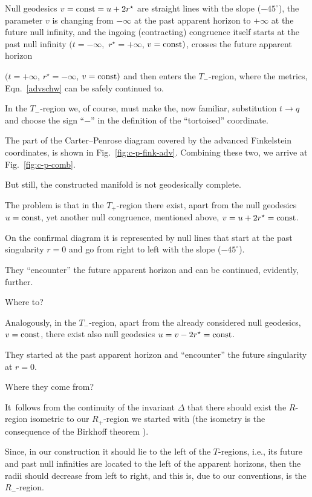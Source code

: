 Null geodesics $v = {\rm const} = u + 2 r^{\star}$ are straight lines with the slope ($- 45^{\circ}$), the parameter $v$ is changing from ${-\infty}$ at the past apparent horizon to ${+\infty}$ at the future null infinity, and the ingoing (contracting) congruence itself starts at the past null infinity $({t = -\infty},$ $ r^{\star} = +\infty$, $ v = \rm const)$, crosses the future apparent horizon 

$(t = +\infty$, $ r^{\star} = -\infty$, $ v = \rm const)$ and then enters the $T_-$-region, where the metrics, Eqn.~\eqref{advschw} can be safely continued to. 

In the $T_-$-region we, of course, must make the, now familiar, substitution $t\rightarrow q$ and choose the sign ``$-$'' in the definition of the ``tortoised'' coordinate. 

The part of the Carter--Penrose diagram covered by the advanced Finkelstein coordinates, is shown in Fig.~\ref{fig:c-p-fink-adv}. Combining these two, we arrive at Fig.~\ref{fig:c-p-comb}.





But still, the constructed manifold is not geodesically complete. 

The problem is that in the $T_+$-region there exist, apart from the null geodesics $u = \rm const$, yet another null congruence, mentioned above, $v = u + 2 r^{\star} = \rm const$. 

On the confirmal diagram it is represented by null lines that start at the past singularity $r = 0$ and go from right to left with the slope ($- 45^{\circ}$). 

They ``encounter'' the future apparent horizon and can be continued, evidently, further. 

Where to? 

Analogously, in the $T_-$-region, apart from the already considered null geodesics, $v = \rm const$, there exist also null geodesics $u = v - 2 r^{\star} = \rm const$. 

They started at the past apparent horizon and ``encounter'' the future singularity at $r = 0$. 

Where they come from? 

It~follows from the continuity of the invariant $\Delta$ that there should exist the $R$-region isometric to our $R_+$-region we started with (the isometry is the consequence of the Birkhoff theorem \cite{berez:Bir}). 

Since, in our construction it should lie to the left of the $T$-regions, i.e., its future and past null infinities are located to the left of the apparent horizons, then the radii should decrease from left to right, and this is, due to our conventions, is the $R_-$-region. 

